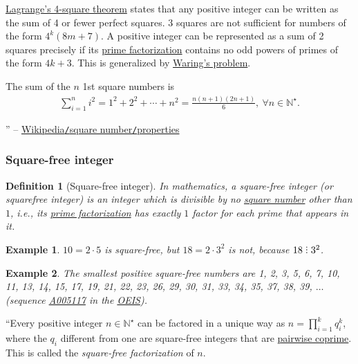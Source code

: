 \documentclass{article}
\newtheorem{definition}{Definition}
\newtheorem{example}{Example}
\DeclareRobustCommand{\divby}{%
	\mathrel{\vbox{\baselineskip.65ex\lineskiplimit0pt\hbox{.}\hbox{.}\hbox{.}}}%
}
\begin{document}
\href{https://en.wikipedia.org/wiki/Lagrange%27s_four-square_theorem}{Lagrange's 4-square theorem} states that any positive integer can be written as the sum of 4 or fewer perfect squares. 3 squares are not sufficient for numbers of the form $4^k(8m + 7)$. A positive integer can be represented as a sum of 2 squares precisely if its \href{https://en.wikipedia.org/wiki/Prime_factorization}{prime factorization} contains no odd powers of primes of the form $4k + 3$. This is generalized by \href{https://en.wikipedia.org/wiki/Waring%27s_problem}{Waring's problem}.


The sum of the $n$ 1st square numbers is
\begin{align*}
	\boxed{\sum_{i=1}^n i^2 = 1^2 + 2^2 + \cdots + n^2 = \frac{n(n + 1)(2n + 1)}{6},\ \forall n\in\mathbb{N}^\star.}
\end{align*}

'' -- \href{https://en.wikipedia.org/wiki/Square_number#Properties}{Wikipedia\texttt{/}square number\texttt{/}properties}

\subsubsection{Square-free integer}

\begin{definition}[Square-free integer]
	In mathematics, a \emph{square-free integer} (or \emph{squarefree integer}) is an integer which is divisible by no \href{https://en.wikipedia.org/wiki/Square_number}{square number} other than $1$, i.e., its \href{https://en.wikipedia.org/wiki/Prime_factorization}{prime factorization} has exactly $1$ factor for each prime that appears in it.
\end{definition}

\begin{example}
	$10 = 2\cdot5$ is square-free, but $18 = 2\cdot3^2$ is not, because $18\divby3^2$.
\end{example}

\begin{example}
	The smallest positive square-free numbers are \emph{1, 2, 3, 5, 6, 7, 10, 11, 13, 14, 15, 17, 19, 21, 22, 23, 26, 29, 30, 31, 33, 34, 35, 37, 38, 39}, $\ldots$ (sequence \href{https://oeis.org/A005117}{A005117} in the \href{https://en.wikipedia.org/wiki/On-Line_Encyclopedia_of_Integer_Sequences}{OEIS}).
\end{example}
``Every positive integer $n\in\mathbb{N}^\star$ can be factored in a unique way as $n = \prod_{i=1}^k q_i^k$, where the $q_i$ different from one are square-free integers that are \href{https://en.wikipedia.org/wiki/Pairwise_coprime}{pairwise coprime}. This is called the \textit{square-free factorization} of $n$.
\end{document}
